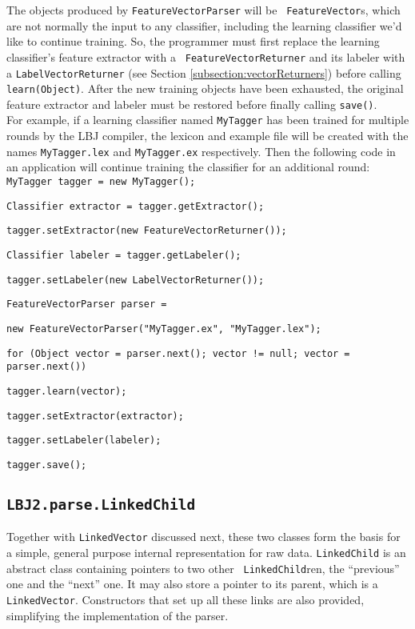 The objects produced by {\tt FeatureVectorParser} will be {\tt
FeatureVector}s, which are not normally the input to any classifier, including
the learning classifier we'd like to continue training.  So, the programmer
must first replace the learning classifier's feature extractor with a {\tt
FeatureVectorReturner} and its labeler with a {\tt LabelVectorReturner} (see
Section \ref{subsection:vectorReturners}) before calling {\tt learn(Object)}.
After the new training objects have been exhausted, the original feature
extractor and labeler must be restored before finally calling {\tt save()}. \\

For example, if a learning classifier named {\tt MyTagger} has been trained
for multiple rounds by the LBJ compiler, the lexicon and example file will be
created with the names {\tt MyTagger.lex} and {\tt MyTagger.ex} respectively.
Then the following code in an application will continue training the
classifier for an additional round: \\

\vspace{-.25cm}
{\tt MyTagger tagger = new MyTagger();}

{\tt Classifier extractor = tagger.getExtractor();}

{\tt tagger.setExtractor(new FeatureVectorReturner());}

{\tt Classifier labeler = tagger.getLabeler();}

{\tt tagger.setLabeler(new LabelVectorReturner());}

{\tt FeatureVectorParser parser =}

\hspace{.4cm} {\tt new FeatureVectorParser("MyTagger.ex", "MyTagger.lex");}

{\tt for (Object vector = parser.next(); vector != null;
          vector = parser.next())}

\hspace{.4cm} {\tt tagger.learn(vector);}

{\tt tagger.setExtractor(extractor);}

{\tt tagger.setLabeler(labeler);}

{\tt tagger.save();}

\subsection{{\tt LBJ2.parse.LinkedChild}} \label{subsection:linkedChild}
Together with {\tt LinkedVector} discussed next, these two classes form the
basis for a simple, general purpose internal representation for raw data.
{\tt LinkedChild} is an abstract class containing pointers to two other {\tt
LinkedChild}ren, the ``previous'' one and the ``next'' one.  It may also store
a pointer to its parent, which is a {\tt LinkedVector}.  Constructors that set
up all these links are also provided, simplifying the implementation of the
parser.

